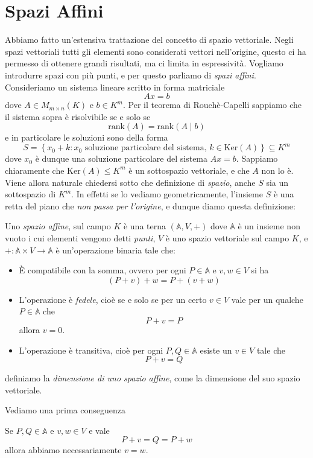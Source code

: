 \documentclass[11pt]{scrartcl}
\renewcommand{\rank}[1]{\text{rank}\!\left(#1\right)}
\renewcommand{\ker}[1]{\text{Ker}\left(#1\right)}
\begin{document}
   	 \section{Spazi Affini}
   	 Abbiamo fatto un'estensiva trattazione del concetto di spazio vettoriale. Negli spazi vettoriali tutti gli elementi sono considerati vettori nell'origine, questo ci ha permesso di ottenere grandi risultati, ma ci limita in espressività. Vogliamo introdurre spazi con più punti, e per questo parliamo di \textit{spazi affini}. Consideriamo un sistema lineare scritto in forma matriciale
   	 $$Ax=b$$
   	 dove $A\in M_{m\times n}(K)$ e $b\in K^m$. Per il teorema di Rouchè-Capelli sappiamo che il sistema sopra è risolvibile se e solo se 
   	 $$\rank{A}=\rank{A\mid b}$$
   	 e in particolare le soluzioni sono della forma
   	 $$S=\left\{x_0+k:x_0 \text{ soluzione particolare del sistema},\, k\in \ker{A}\right\}\subseteq K^m$$
   	 dove $x_0$ è dunque una soluzione particolare del sistema $Ax=b$. Sappiamo chiaramente che $\ker{A}\le K^m$ è un sottospazio vettoriale, e che $A$ non lo è. Viene allora naturale chiedersi sotto che definizione di \textit{spazio}, anche $S$ sia un sottospazio di $K^m$. In effetti se lo vediamo geometricamente, l'insieme $S$ è una retta del piano che \textit{non passa per l'origine}, e dunque diamo questa definizione:
   	 \begin{definition}
   	 	Uno \textit{spazio affine}, sul campo $K$ è una terna $(\mathbb{A},V,+)$ dove $\mathbb{A}$ è un insieme non vuoto i cui elementi vengono detti \textit{punti}, $V$ è uno spazio vettoriale sul campo $K$, e $+:\mathbb{A}\times V \to \mathbb{A}$ è un'operazione binaria tale che:
   	 	\begin{itemize}
   	 		\item \`E compatibile con la somma, ovvero per ogni $P\in \mathbb{A}$ e $v,w\in V$ si ha
   	 		$$\left(P+v\right)+w=P+(v+w)$$
   	 		\item L'operazione è \textit{fedele}, cioè se e solo se per un certo $v\in V$ vale per un qualche $P\in \mathbb{A}$ che
   	 		$$P+v=P$$
   	 		allora $v=0$.
   	 		\item L'operazione è transitiva, cioè per ogni $P,Q\in \mathbb{A}$ esiste un $v\in V$ tale che 
   	 		$$P+v=Q$$
   	 	\end{itemize}
   	 	definiamo la \textit{dimensione di uno spazio affine}, come la dimensione del suo spazio vettoriale.
   	 \end{definition}
   	 Vediamo una prima conseguenza
   	 \begin{proposition}
   	 	Se $P,Q\in\mathbb{A}$ e $v,w\in V$ e vale
   	 	$$P+v=Q=P+w$$
   	 	allora abbiamo necessariamente $v=w$.
   	 \end{proposition}
\end{document}
